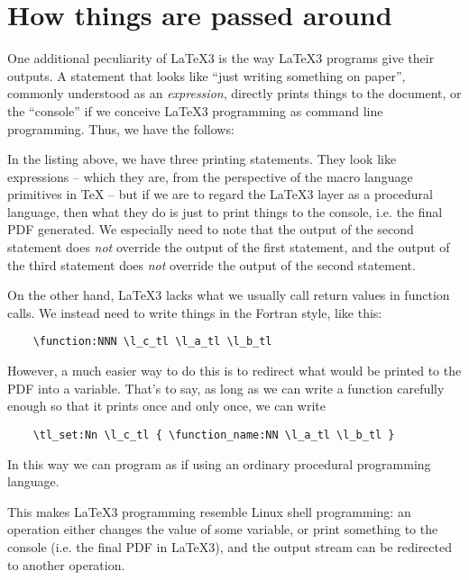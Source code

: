 \documentclass[hyperref, a4paper, 12pt]{article}
\begin{document}
\section{How things are passed around}

One additional peculiarity of \LaTeX 3 is the way \LaTeX 3 programs give their outputs.
A statement that looks like ``just writing something on paper'',
commonly understood as an \emph{expression},
directly prints things to the document,
or the ``console'' if we conceive \LaTeX 3 programming as command line programming.
Thus, we have the follows:


In the listing above, we have three printing statements.
They look like expressions
-- which they are, from the perspective of the macro language primitives in \TeX{}  --
but if we are to regard the \LaTeX 3 layer as a procedural language,
then what they do is just to print things to the console, i.e. the final PDF generated.
We especially need to note that the output of the second statement does \emph{not}
override the output of the first statement,
and the output of the third statement does \emph{not} override the output of the second statement.

On the other hand, \LaTeX 3 lacks what we usually call return values in function calls.
We instead need to write things in the Fortran style, like this:

\begin{lstlisting}
    \function:NNN \l_c_tl \l_a_tl \l_b_tl
\end{lstlisting}

However, a much easier way to do this is to redirect what would be printed to the PDF 
into a variable.
That's to say, as long as we can write a function carefully enough 
so that it prints once and only once,
we can write 

\begin{lstlisting}
    \tl_set:Nn \l_c_tl { \function_name:NN \l_a_tl \l_b_tl }
\end{lstlisting}

In this way we can program as if using an ordinary procedural programming language.

This makes \LaTeX 3 programming resemble Linux shell programming:
an operation either changes the value of some variable,
or print something to the console (i.e. the final PDF in \LaTeX 3),
and the output stream can be redirected to another operation.
\end{document}
